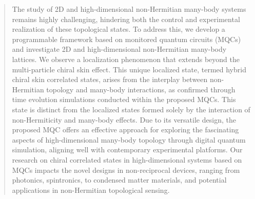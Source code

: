 \documentclass[longbibliography, aps, prx, amsmath, amssymb, amsfonts, twocolumn,superscriptaddress, footinbib]{revtex4-1}
\begin{document}
	
	
	
	\begin{abstract}

		The study of 2D and high-dimensional non-Hermitian many-body systems remains highly challenging, hindering both the control and experimental realization of these topological states.
		To address this, we develop a programmable framework based on monitored quantum circuits (MQCs) and investigate 2D and high-dimensional non-Hermitian many-body lattices.
		We observe a localization phenomenon that extends beyond the multi-particle chiral skin effect. This unique localized state, termed hybrid chiral skin correlated states, arises from the interplay between non-Hermitian topology and many-body interactions, as confirmed through time evolution simulations conducted within the proposed MQCs. This state is distinct from the localized states formed solely by the interaction of non-Hermiticity and many-body effects. Due to its versatile design, the proposed MQC offers an effective approach for exploring the fascinating aspects of high-dimensional many-body topology through digital quantum simulation, aligning well with contemporary experimental platforms.
		Our research on chiral correlated states in high-dimensional systems based on MQCs 
		{
		impacts the novel designs in non-reciprocal devices, ranging from photonics, spintronics, to condensed matter materials, and potential applications in non-Hermitian topological sensing.}
	\end{abstract}
	
	
	\maketitle
	
\end{document}
